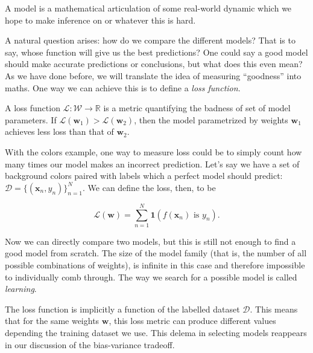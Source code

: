 \begin{definition}[model]
    A model is a mathematical articulation of some real-world dynamic which we hope to make inference on or whatever this is hard. 
\end{definition}

A natural question arises: how do we compare the different models? That is to say, whose function will give us the best predictions? One could say a good model should make accurate predictions or conclusions, but what does this even mean? As we have done before, we will translate the idea of measuring ``goodness'' into maths. One way we can achieve this is to define a \emph{loss function}.
\begin{definition}
    A loss function $\mathcal L : \mathcal W \to \mathbb R$ is a metric quantifying the badness of set of model parameters. If $\mathcal L(\bm w_1) > \mathcal L(\bm w_2)$, then the model parametrized by weights $\bm w_1$ achieves less loss than that of $\bm w_2$.
\end{definition}

With the colors example, one way to measure loss could be to simply count how many times our model makes an incorrect prediction. Let's say we have a set of background colors paired with labels which a perfect model should predict: $\mathcal D = \{ (\bm x_n, y_n) \}_{n=1}^{N}$. We can define the loss, then, to be

$$\mathcal L(\bm w) = \sum_{n = 1}^N \bm 1(f(\bm x_n) \text{ is } y_n).$$

Now we can directly compare two models, but this is still not enough to find a good model from scratch. The size of the model family (that is, the number of all possible combinations of weights), is infinite in this case and therefore impossible to individually comb through. The way we search for a possible model is called \emph{learning}.

\begin{warning}
    The loss function is implicitly a function of the labelled dataset $\mathcal D$. This means that for the same weights $\bm w$, this loss metric can produce different values depending the training dataset we use. This delema in selecting models reappears in our discussion of the bias-variance tradeoff.
\end{warning}




